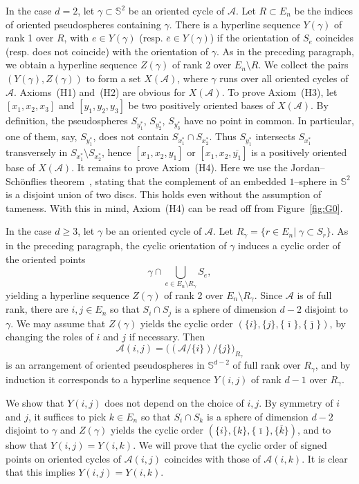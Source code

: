\documentclass[a4paper]{amsart}
\newcommand{\p}{\mathbb S}
\theoremstyle{definition}
\theoremstyle{remark}
\begin{document}
In the case $d=2$, let $\gamma\subset \p^2$ be an oriented cycle of
$\mathcal A$. Let $R\subset E_n$ be the indices of oriented
pseudospheres containing $\gamma$. 
There is a hyperline sequence $Y(\gamma)$ of rank 1 over $R$, with $e\in
Y(\gamma)$ (resp. $\overline e\in Y(\gamma)$) if the orientation of
$S_e$ coincides (resp. does not coincide) with the orientation of
$\gamma$. 
%
As in the preceding paragraph, we
obtain a hyperline sequence $Z(\gamma)$ of rank 2 over $E_n\setminus
R$. 
%
We collect the pairs $(Y(\gamma),Z(\gamma))$ to form a set $X(\mathcal
A)$, where $\gamma$ runs over all oriented cycles of $\mathcal A$. 
%
Axioms~(H1) and~(H2) are obvious for $X(\mathcal A)$. To prove
Axiom~(H3), let $[x_1,x_2,x_3]$ and $[y_1,y_2,y_3]$ be two positively
oriented bases of $X(\mathcal A)$. By definition, the pseudospheres
$S_{y^*_1}$, $S_{y^*_2}$, $S_{y^*_3}$ have no point in common. In
particular, one of them, say,  $S_{y^*_1}$, does not contain
$S_{x^*_1}\cap S_{x^*_2}$. Thus $S_{y^*_1}$ intersects $S_{x^*_1}$
transversely in $S_{x^*_1}\setminus S_{x^*_2}$, hence $[x_1,x_2,y_1]$ or
$[x_1,x_2,\overline {y_1}]$ is a positively oriented base of $X(\mathcal
A)$. 
%
It remains to prove Axiom~(H4). Here we use the Jordan--Sch\"onflies
theorem~\cite{stoeckerzieschang}, stating that the complement of an
embedded $1$--sphere in $\p^2$ is a disjoint union of two discs. This
holds even without the assumption of tameness.
With this in mind, Axiom~(H4)  can be read off from Figure~\ref{fig:G0}.


In the case $d\ge 3$, let $\gamma$ be an oriented  cycle of $\mathcal
A$.
Let $R_\gamma= \{r\in E_n |\; \gamma\subset S_r\}$. 
As in the preceding paragraph, the cyclic orientation of $\gamma$
induces a cyclic order of the oriented points 
$$\gamma\cap \bigcup_{e\in E_n\setminus R_\gamma} S_e,$$ 
yielding a hyperline sequence $Z(\gamma)$ of rank 2 over $E_n\setminus
R_\gamma$. 
%
Since $\mathcal A$ is of full rank, there are $i,j\in E_n$ so that
$S_i\cap S_j$ is a sphere of dimension $d-2$ disjoint to $\gamma$.  We
may assume that $Z(\gamma)$ yields the cyclic order
$(\{i\},\{j\},\{\overline \imath\},\{\overline \jmath\})$, by changing the roles
of $i$ and $j$ if necessary.
%
Then $$\mathcal A(i,j) = \big((\mathcal
A/\{i\})\big/\{j\}\big)_{R_\gamma}$$
is an arrangement of oriented
pseudospheres in $\p^{d-2}$ of full rank over $R_\gamma$, and by
induction it corresponds to a hyperline sequence $Y(i,j)$ of rank
$d-1$ over $R_\gamma$.

We show that $Y(i,j)$ does not depend on the choice of $i,j$.  By
symmetry of $i$ and $j$, it suffices to pick $k\in E_n$ so that $S_i\cap
S_k$ is a sphere of dimension $d-2$ disjoint to $\gamma$ and $Z(\gamma)$
yields the cyclic order $(\{i\},\{k\},\{\overline\imath\},\{\overline
k\})$, and to show that $Y(i,j)=Y(i,k)$.
%
We will prove that the cyclic order of signed points on oriented cycles
of $\mathcal A(i,j)$ coincides with those of $\mathcal A(i,k)$.  It is
clear that this implies $Y(i,j)=Y(i,k)$.
\end{document}
